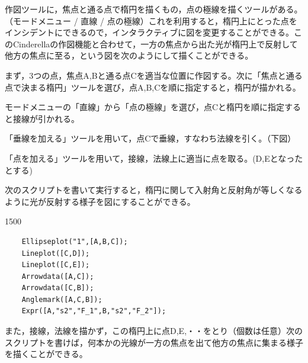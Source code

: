 \documentclass[papersize,a4paper,12pt,uplatex]{jsarticle}
\begin{document}
\begin{description}
作図ツールに，焦点と通る点で楕円を描くもの，点の極線を描くツールがある。（モードメニュー / 直線 / 点の極線）これを利用すると，楕円上にとった点をインシデントにできるので，インタラクティブに図を変更することができる。このCinderellaの作図機能と合わせて，一方の焦点から出た光が楕円上で反射して他方の焦点に至る，という図を次のようにして描くことができる。

まず，3つの点，焦点A,Bと通る点Cを適当な位置に作図する。次に「焦点と通る点で決まる楕円」ツールを選び，点A,B,Cを順に指定すると，楕円が描かれる。

モードメニューの「直線」から「点の極線」を選び，点Cと楕円を順に指定すると接線が引かれる。

「垂線を加える」ツールを用いて，点Cで垂線，すなわち法線を引く。（下図）

「点を加える」ツールを用いて，接線，法線上に適当に点を取る。(D,Eとなったとする)

次のスクリプトを書いて実行すると，楕円に関して入射角と反射角が等しくなるように光が反射する様子を図にすることができる。

\vspace{\baselineskip}
\begin{layer}{150}{0}
\end{layer}
\hspace{50mm}

\begin{verbatim}
    Ellipseplot("1",[A,B,C]);
    Lineplot([C,D]);
    Lineplot([C,E]);
    Arrowdata([A,C]);
    Arrowdata([C,B]);
    Anglemark([A,C,B]);
    Expr([A,"s2","F_1",B,"s2","F_2"]);
\end{verbatim}
\vspace{\baselineskip}
    \begin{center} \end{center}

  また，接線，法線を描かず，この楕円上に点D,E,・・をとり（個数は任意）次のスクリプトを書けば，何本かの光線が一方の焦点を出て他方の焦点に集まる様子を描くことができる。
  

\end{description}
\end{document}
